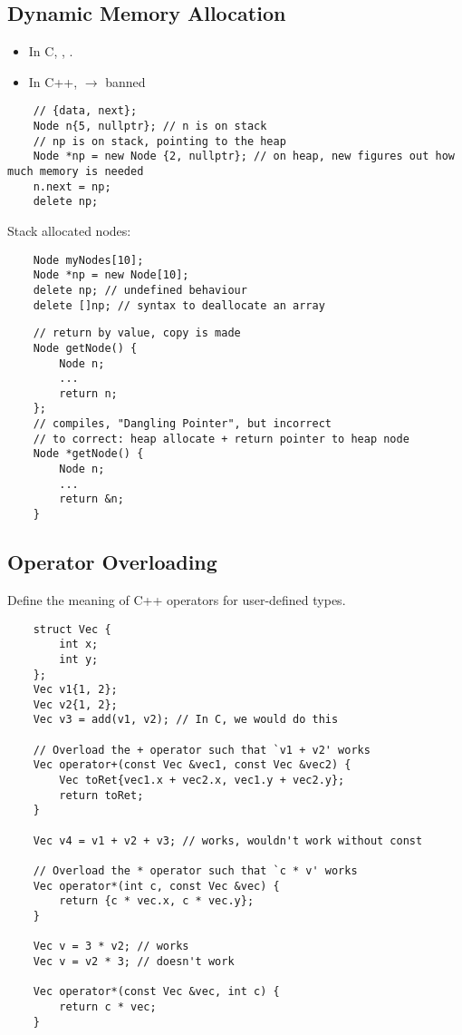 \subsection{Dynamic Memory Allocation}
\begin{itemize}
      \item In C, , .
      \item In C++,  $ \rightarrow $ banned
\end{itemize}
\begin{lstlisting}
    // {data, next};
    Node n{5, nullptr}; // n is on stack
    // np is on stack, pointing to the heap
    Node *np = new Node {2, nullptr}; // on heap, new figures out how much memory is needed
    n.next = np;
    delete np;
\end{lstlisting}
Stack allocated nodes:
\begin{lstlisting}
    Node myNodes[10];
    Node *np = new Node[10];
    delete np; // undefined behaviour
    delete []np; // syntax to deallocate an array
\end{lstlisting}
\begin{lstlisting}
    // return by value, copy is made
    Node getNode() {
        Node n;
        ...
        return n;
    };
    // compiles, "Dangling Pointer", but incorrect
    // to correct: heap allocate + return pointer to heap node
    Node *getNode() {
        Node n;
        ...
        return &n;
    }
\end{lstlisting}

\subsection{Operator Overloading}
Define the meaning of C++ operators for user-defined types.
\begin{lstlisting}
    struct Vec {
        int x;
        int y;
    };
    Vec v1{1, 2};
    Vec v2{1, 2};
    Vec v3 = add(v1, v2); // In C, we would do this

    // Overload the + operator such that `v1 + v2' works
    Vec operator+(const Vec &vec1, const Vec &vec2) {
        Vec toRet{vec1.x + vec2.x, vec1.y + vec2.y};
        return toRet;
    }

    Vec v4 = v1 + v2 + v3; // works, wouldn't work without const
    
    // Overload the * operator such that `c * v' works
    Vec operator*(int c, const Vec &vec) {
        return {c * vec.x, c * vec.y};
    }

    Vec v = 3 * v2; // works
    Vec v = v2 * 3; // doesn't work
    
    Vec operator*(const Vec &vec, int c) {
        return c * vec;
    }
\end{lstlisting}

